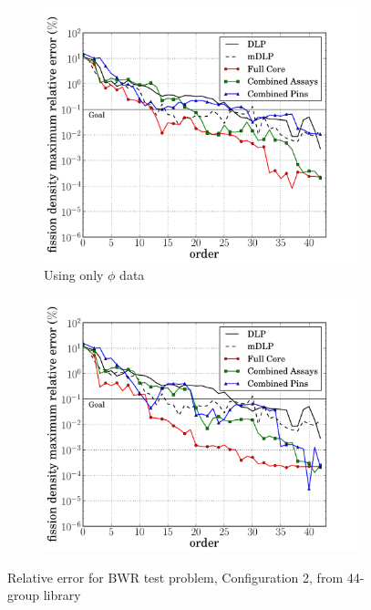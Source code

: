 \documentclass[5p,times,twocolumn,10pt]{elsarticle}
\begin{document}
    \begin{figure}[tb]
        \centering
        \begin{subfigure}{0.5\textwidth}
            \centering
            \includegraphics[trim=.1cm .25cm 2.0cm .4cm, clip=true,
            totalheight=0.261\textheight]
            {BWR2_44_energy_basis_comparison_fission-44}
            \caption{Using only $\phi$ data}
            \label{fig:core2-44a}
        \end{subfigure}%
        \begin{subfigure}{0.5\textwidth}
            \centering
            \includegraphics[trim=.1cm .25cm 2.0cm .4cm, clip=true,
            totalheight=0.261\textheight]
            {BWR2_44_partial_energy_basis_comparison_fission-44}
            \label{fig:core2-44b}
        \end{subfigure}
        \caption{Relative error for BWR test problem, Configuration 2, from
            44-group library}
        \label{fig:core2-44}
    \end{figure}
\end{document}

